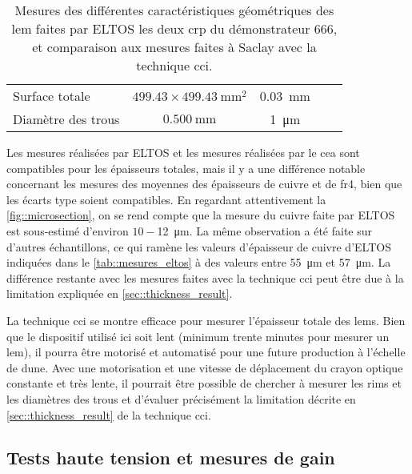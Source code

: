 \begin{table}
\begin{tabular}{|l|c|c||c|c|}
                    Surface totale &  $499.43\times\SI{499.43}{\milli\meter\squared}$ & \SI{0.03}{\milli\meter} & &\\
                    Diamètre des trous & $\SI{0.500}{\milli\meter}$ & \SI{1}{\micro\meter} & &\\
                     \hline
                \end{tabular}
                \caption[Mesures des différentes caractéristiques géométriques des \gls{lem}]{Mesures des différentes caractéristiques géométriques des \gls{lem} faites par ELTOS les deux \gls{crp} du démonstrateur 666, et comparaison aux mesures faites à Saclay avec la technique \gls{cci}.\label{tab::mesures_eltos}}
            \end{table}
            
            Les mesures réalisées par ELTOS et les mesures réalisées par le \gls{cea} sont compatibles pour les épaisseurs totales, mais il y a une différence notable concernant les mesures des moyennes des épaisseurs de cuivre et de \gls{fr4}, bien que les écarts type soient compatibles. En regardant attentivement la \autoref{fig::microsection}, on se rend compte que la mesure du cuivre faite par ELTOS est sous-estimé d'environ $10-$\SI{12}{\micro\meter}. La même observation a été faite sur d'autres échantillons, ce qui ramène les valeurs d'épaisseur de cuivre d'ELTOS indiquées dans le \autoref{tab::mesures_eltos} à des valeurs entre \SI{55}{\micro\meter} et \SI{57}{\micro\meter}. La différence restante avec les mesures faites avec la technique \gls{cci} peut être due à la limitation expliquée en \autoref{sec::thickness_result}.
            
            La technique \gls{cci} se montre efficace pour mesurer l'épaisseur totale des \glspl{lem}. Bien que le dispositif utilisé ici soit lent (minimum trente minutes pour mesurer un \gls{lem}), il pourra être motorisé et automatisé pour une future production à l'échelle de \gls{dune}. Avec une motorisation et une vitesse de déplacement du crayon optique constante et très lente, il pourrait être possible de chercher à mesurer les rims et les diamètres des trous et d'évaluer précisément la limitation décrite en \autoref{sec::thickness_result} de la technique \gls{cci}.
        
        \subsection{Tests haute tension et mesures de gain}\label{sec::test_HT}
        
